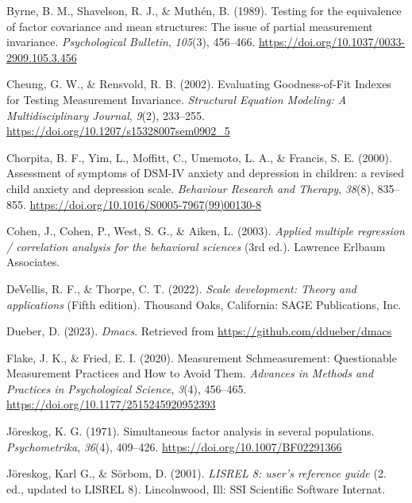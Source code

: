 \documentclass[
  man]{apa6}
\newlength{\cslhangindent}
\newlength{\cslentryspacingunit} %
\newenvironment{CSLReferences}[2] %
 {%
  \setlength{\parindent}{0pt}
  \ifodd #1
  \let\oldpar\par
  \def\par{\hangindent=\cslhangindent\oldpar}
  \fi
  \setlength{\parskip}{#2\cslentryspacingunit}
 }%
 {}
\begin{document}
\begin{CSLReferences}{1}{0}
\leavevmode{}%
Byrne, B. M., Shavelson, R. J., \& Muthén, B. (1989). Testing for the equivalence of factor covariance and mean structures: The issue of partial measurement invariance. \emph{Psychological Bulletin}, \emph{105}(3), 456--466. \url{https://doi.org/10.1037/0033-2909.105.3.456}

\leavevmode{}%
Cheung, G. W., \& Rensvold, R. B. (2002). Evaluating Goodness-of-Fit Indexes for Testing Measurement Invariance. \emph{Structural Equation Modeling: A Multidisciplinary Journal}, \emph{9}(2), 233--255. \url{https://doi.org/10.1207/s15328007sem0902_5}

\leavevmode{}%
Chorpita, B. F., Yim, L., Moffitt, C., Umemoto, L. A., \& Francis, S. E. (2000). Assessment of symptoms of DSM-IV anxiety and depression in children: a revised child anxiety and depression scale. \emph{Behaviour Research and Therapy}, \emph{38}(8), 835--855. \url{https://doi.org/10.1016/S0005-7967(99)00130-8}

\leavevmode{}%
Cohen, J., Cohen, P., West, S. G., \& Aiken, L. (2003). \emph{Applied multiple regression / correlation analysis for the behavioral sciences} (3rd ed.). Lawrence Erlbaum Associates.

\leavevmode{}%
DeVellis, R. F., \& Thorpe, C. T. (2022). \emph{Scale development: Theory and applications} (Fifth edition). Thousand Oaks, California: SAGE Publications, Inc.

\leavevmode{}%
Dueber, D. (2023). \emph{Dmacs}. Retrieved from \url{https://github.com/ddueber/dmacs}

\leavevmode{}%
Flake, J. K., \& Fried, E. I. (2020). Measurement Schmeasurement: Questionable Measurement Practices and How to Avoid Them. \emph{Advances in Methods and Practices in Psychological Science}, \emph{3}(4), 456--465. \url{https://doi.org/10.1177/2515245920952393}

\leavevmode{}%
Jöreskog, K. G. (1971). Simultaneous factor analysis in several populations. \emph{Psychometrika}, \emph{36}(4), 409--426. \url{https://doi.org/10.1007/BF02291366}

\leavevmode{}%
Jöreskog, Karl G., \& Sörbom, D. (2001). \emph{LISREL 8: user's reference guide} (2. ed., updated to LISREL 8). Lincolnwood, Ill: SSI Scientific Software Internat.


\end{CSLReferences}
\end{document}
